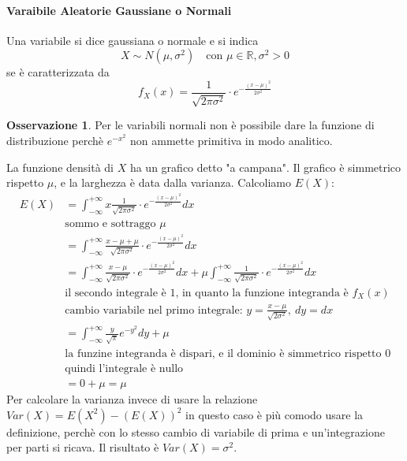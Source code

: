 \documentclass{article}
\theoremstyle{plain}
\theoremstyle{definition}
\newtheorem{osservazione}{Osservazione}[section]
\theoremstyle{remark}
\begin{document}
\paragraph{Varaibile Aleatorie Gaussiane o Normali} %
\label{par:varaibile_aleatorie_gaussiane_o_normali}
Una variabile si dice gaussiana o normale e si indica
\begin{equation*}
	X\sim N(\mu, \sigma^2)\quad\text{con }\mu\in\mathds{R},\sigma^2>0
\end{equation*}
se è caratterizzata da
\begin{equation*}
	f_X(x)=\frac{1}{\sqrt{2\pi\sigma^2}}\cdot e^{-\frac{(x-\mu)^2}{2\sigma^2}}
\end{equation*}
\begin{osservazione}
	Per le variabili normali non è possibile dare la funzione di distribuzione perchè $e^{-x^2}$ non ammette primitiva in modo analitico.
\end{osservazione}
La funzione densità di $X$ ha un grafico detto "a campana". Il grafico è simmetrico rispetto $\mu$, e la larghezza è data dalla varianza. Calcoliamo $E(X)$:
\begin{align*}
	E(X)&=\int_{-\infty}^{+\infty}x\frac{1}{\sqrt{2\pi\sigma^2}}\cdot e^{-\frac{(x-\mu)^2}{2\sigma^2}}dx\\
	&\text{sommo e sottraggo }\mu\\
	&=\int_{-\infty}^{+\infty}\frac{x-\mu+\mu}{\sqrt{2\pi\sigma^2}}\cdot e^{-\frac{(x-\mu)^2}{2\sigma^2}}dx\\
	&=\int_{-\infty}^{+\infty}\frac{x-\mu}{\sqrt{2\pi\sigma^2}}\cdot e^{-\frac{(x-\mu)^2}{2\sigma^2}}dx+\mu\int_{-\infty}^{+\infty}\frac{1}{\sqrt{2\pi\sigma^2}}\cdot e^{-\frac{(x-\mu)^2}{2\sigma^2}}dx\\
	&\text{il secondo integrale è }1\text{, in quanto la funzione integranda è }f_X(x)\\
	&\text{cambio variabile nel primo integrale: }y=\frac{x-\mu}{\sqrt{2\sigma^2}},\ dy=dx\\
	&=\int_{-\infty}^{+\infty}\frac{y}{\sqrt{\pi}}e^{-y^2}dy+\mu\\
	&\text{la funzine integranda è dispari, e il dominio è simmetrico rispetto }0\\
	&\text{quindi l'integrale è nullo}\\
	&=0+\mu=\mu
\end{align*}
Per calcolare la varianza invece di usare la relazione $Var(X)=E(X^2)-(E(X))^2$ in questo caso è più comodo usare la definizione, perchè con lo stesso cambio di variabile di prima e un'integrazione per parti si ricava. Il risultato è $Var(X)=\sigma^2$.
\end{document}
